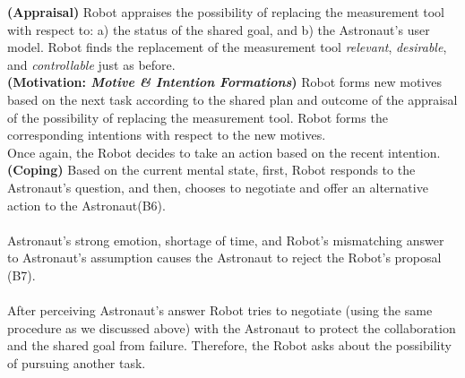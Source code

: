 \noindent\textbf{(Appraisal)} Robot appraises the possibility of
replacing the measurement tool with respect to: a) the status of the shared
goal, and b) the Astronaut's user model. Robot finds the replacement of the
measurement tool \textit{relevant}, \textit{desirable}, and
\textit{controllable} just as before.\\

\noindent\textbf{(Motivation: \textit{Motive \& Intention Formations})} Robot
forms new motives based on the next task according to the shared plan and
outcome of the appraisal of the possibility of replacing the measurement tool.
Robot forms the corresponding intentions with respect to the new motives.\\

Once again, the Robot decides to take an action based on the recent intention.\\

\noindent\textbf{(Coping)} Based on the current mental state, first, Robot
responds to the Astronaut's question, and then, chooses to negotiate and offer
an alternative action to the Astronaut(B6).\\

\noindent{}\\

Astronaut's strong emotion, shortage of time, and Robot's mismatching answer to
Astronaut's assumption causes the Astronaut to reject the Robot's proposal
(B7).\\

\noindent{}\\

After perceiving Astronaut's answer Robot tries to negotiate (using the same
procedure as we discussed above) with the Astronaut to protect the collaboration
and the shared goal from failure. Therefore, the Robot asks about the
possibility of pursuing another task.\\

\noindent{}\\

